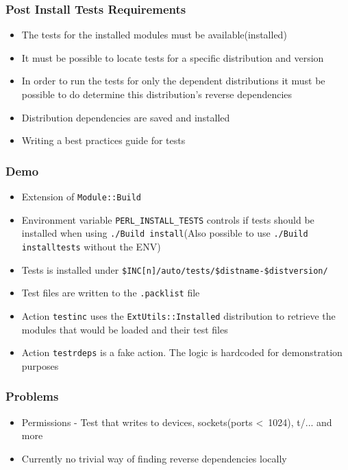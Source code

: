 \documentclass[10pt]{beamer}
\begin{document}
\begin{frame}
\frametitle{Post Install Tests Requirements}
\begin{itemize}
\item The tests for the installed modules must be available(installed)
\item It must be possible to locate tests for a specific distribution and version
\item In order to run the tests for only the dependent distributions it must be possible to do determine this distribution's reverse dependencies
\item Distribution dependencies are saved and installed
\item Writing a best practices guide for tests
\end{itemize}
\end{frame}

\begin{frame}[fragile]
\frametitle{Demo}

\begin{itemize}
\item Extension of \verb|Module::Build|
\item Environment variable \verb|PERL_INSTALL_TESTS| controls if tests should be installed when using  \verb|./Build install|(Also possible to use \verb|./Build installtests| without the ENV)
\item Tests is installed under \verb|$INC[n]/auto/tests/$distname-$distversion/|
\item Test files are written to the \verb|.packlist| file
\item Action \verb|testinc| uses the \verb|ExtUtils::Installed| distribution to retrieve the modules that would be loaded and their test files
\item Action \verb|testrdeps| is a fake action. The logic is hardcoded for demonstration purposes
\end{itemize}
\end{frame}

\begin{frame}[fragile]
\frametitle{Problems}
\begin{itemize}
\item Permissions - Test that writes to devices, sockets(ports \textless \ 1024), t/... and more
\item Currently no trivial way of finding reverse dependencies locally
\end{itemize}
\end{frame}
\end{document}
